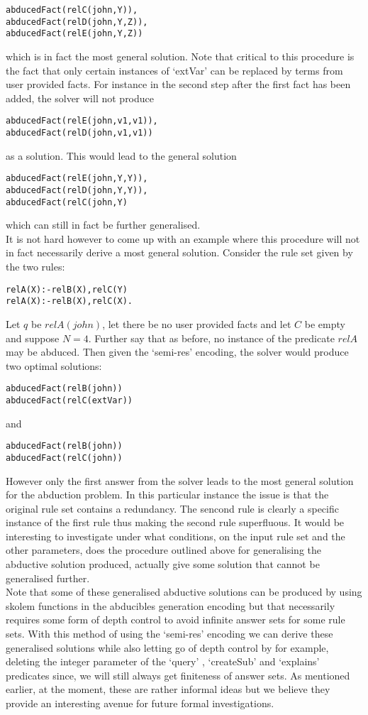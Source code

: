 \begin{lstlisting}[frame = none]
abducedFact(relC(john,Y)), 
abducedFact(relD(john,Y,Z)), 
abducedFact(relE(john,Y,Z)) 
\end{lstlisting}
which is in fact the most general solution. Note that critical to this procedure is the fact that only certain instances of ‘extVar’ can be replaced by terms from user provided facts. For instance in the second step after the first fact has been added, the solver will not produce 
\begin{lstlisting}[frame = none]
abducedFact(relE(john,v1,v1)),
abducedFact(relD(john,v1,v1))
\end{lstlisting}
as a solution. This would lead to the general solution \begin{lstlisting}[frame = none]
abducedFact(relE(john,Y,Y)),
abducedFact(relD(john,Y,Y)),
abducedFact(relC(john,Y)
\end{lstlisting} which can still in fact be further generalised.\\ It is not hard however to come up with an example where this procedure will not in fact necessarily derive a most general solution. Consider the rule set given by the two rules:
\begin{lstlisting}[frame = none]
relA(X):-relB(X),relC(Y)
relA(X):-relB(X),relC(X).
\end{lstlisting}
Let $q$ be $relA(john)$, let there be no user provided facts and let $C$ be empty and suppose $N = 4$. Further say that as before, no instance of the predicate $relA$ may be abduced. Then given the ‘semi-res’ encoding, the solver would produce two optimal solutions:
\begin{lstlisting}[frame = none]
abducedFact(relB(john))
abducedFact(relC(extVar))
\end{lstlisting} and 
\begin{lstlisting}[frame = none]
abducedFact(relB(john))
abducedFact(relC(john))
\end{lstlisting}
However only the first answer from the solver leads to the most general solution for the abduction problem. In this particular instance the issue is that the original rule set contains a redundancy. The sencond rule is clearly a specific instance of the first rule thus making the second rule superfluous. It would be interesting to investigate under what conditions, on the input rule set and the other parameters, does the procedure outlined above for generalising the abductive solution produced, actually give some solution that cannot be generalised further. \\Note that some of these generalised abductive solutions can be produced by using skolem functions in the abducibles generation encoding but that necessarily requires some form of depth control to avoid infinite answer sets for some rule sets. With this method of using the ‘semi-res’ encoding we can derive these generalised solutions while also letting go of depth control by for example, deleting the integer parameter of the  ‘query’ , ‘createSub’ and ‘explains’ predicates since, we will still always get finiteness of answer sets. As mentioned earlier, at the moment, these are rather informal ideas but we believe they provide an interesting avenue for future formal investigations.    






